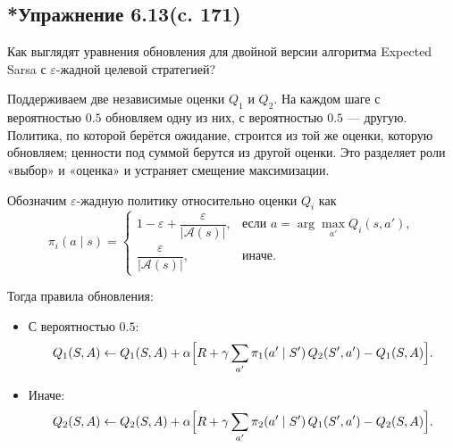 \subsection{*Упражнение 6.13(c. 171)}
Как выглядят уравнения обновления для двойной версии алгоритма Expected Sarsa с $\varepsilon$-жадной целевой стратегией?
\begin{solution}
    Поддерживаем две независимые оценки $Q_1$ и $Q_2$. На каждом шаге с вероятностью $0.5$ обновляем одну из них, с вероятностью $0.5$ — другую. Политика, по которой берётся ожидание, строится из той же оценки, которую обновляем; ценности под суммой берутся из другой оценки. Это разделяет роли «выбор» и «оценка» и устраняет смещение максимизации.

    Обозначим $\varepsilon$-жадную политику относительно оценки $Q_i$ как
    \[
    \pi_i(a \mid s) =
    \begin{cases}
        1 - \varepsilon + \dfrac{\varepsilon}{|\mathcal{A}(s)|}, & \text{если } a = \arg\max_{a'} Q_i(s, a'), \\[6pt]
        \dfrac{\varepsilon}{|\mathcal{A}(s)|}, & \text{иначе}.
    \end{cases}
    \]

    Тогда правила обновления:
    \begin{itemize}
        \item С вероятностью $0.5$:
        \[
        Q_1(S, A) \leftarrow Q_1(S, A) + \alpha\Bigl[R + \gamma \sum_{a'} \pi_1(a' \mid S') \, Q_2(S', a') - Q_1(S, A)\Bigr].
        \]
        \item Иначе:
        \[
        Q_2(S, A) \leftarrow Q_2(S, A) + \alpha\Bigl[R + \gamma \sum_{a'} \pi_2(a' \mid S') \, Q_1(S', a') - Q_2(S, A)\Bigr].
        \]
    \end{itemize}
\end{solution}


